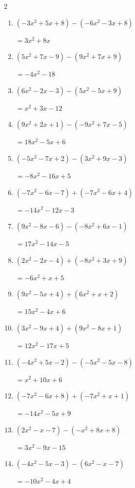 \begin{multicols}{2}
\begin{enumerate}
        $=-15x^{2}+7x-18$

  \item $(-3x^{2}+5x+8)-(-6x^{2}-3x+8)$

        $=3x^{2}+8x$

  \item $(5x^{2}+7x-9)-(9x^{2}+7x+9)$

        $=-4x^{2}-18$

  \item $(6x^{2}-2x-3)-(5x^{2}-5x+9)$

        $=x^{2}+3x-12$

  \item $(9x^{2}+2x+1)-(-9x^{2}+7x-5)$

        $=18x^{2}-5x+6$

  \item $(-5x^{2}-7x+2)-(3x^{2}+9x-3)$

        $=-8x^{2}-16x+5$

  \item $(-7x^{2}-6x-7)+(-7x^{2}-6x+4)$

        $=-14x^{2}-12x-3$

  \item $(9x^{2}-8x-6)-(-8x^{2}+6x-1)$

        $=17x^{2}-14x-5$

  \item $(2x^{2}-2x-4)+(-8x^{2}+3x+9)$

        $=-6x^{2}+x+5$

  \item $(9x^{2}-5x+4)+(6x^{2}+x+2)$

        $=15x^{2}-4x+6$

  \item $(3x^{2}-9x+4)+(9x^{2}-8x+1)$

        $=12x^{2}-17x+5$

  \item $(-4x^{2}+5x-2)-(-5x^{2}-5x-8)$

        $=x^{2}+10x+6$

  \item $(-7x^{2}-6x+8)+(-7x^{2}+x+1)$

        $=-14x^{2}-5x+9$

  \item $(2x^{2}-x-7)-(-x^{2}+8x+8)$

        $=3x^{2}-9x-15$

  \item $(-4x^{2}-5x-3)-(6x^{2}-x-7)$

        $=-10x^{2}-4x+4$


\end{enumerate}
\end{multicols}
